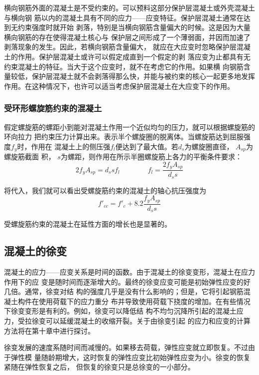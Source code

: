 \documentclass[12pt,a4paper]{book}
\begin{document}
横向钢筋外面的混凝土是不受约束的。可以预料这部分保护层混凝土或外壳混凝土与横向钢
筋以内的混凝土具有不同的应力——应变特征。保护层混凝土通常在达到无约束强度时就开始
剥落，特别是当横向钢筋含量偏大的时候。这是因为大量横向钢筋的存在使得混凝土核心与
保护层之间形成了一个薄弱面，并因而加速了剥落现象的发生。因此，若横向钢筋含量偏大，
就应在大应变时忽略保护层混凝土的作用。保护层混凝土或许可以假定成直到一个假定的剥
落应变为止都具有无约束混凝土的特征。当大于这个应变时，就不在考虑它的作用。如果横
向钢筋含量较低，保护层混凝土就不会剥落得那么快，并能与被约束的核心一起更多地发挥
作用。在这种情况下，也许可以适当考虑保护层混凝土在大应变下的作用。

\subsubsection{受环形螺旋筋约束的混凝土}

假定螺旋筋的螺距小到能对混凝土作用一个近似均匀的压力，就可以根据螺旋筋的环向拉力
把约束压力计算出来。表示半个螺旋圈的脱离体。当螺旋筋达到屈服强度$f_y$时，作用在
混凝土上的侧压强$f_l$便达到了最大值。若$d_s$为螺旋圈直径， $A_{sp}$为螺旋筋截面
积， $s$为螺距，则作用在所示半圈螺旋筋上各力的平衡条件要求：
\begin{equation}
  \label{eq:33}
  2f_yA_{sp}=d_ssf_l \qquad \qquad f_l=\frac{2f_yA_{sp}}{d_ss}
\end{equation}

将代入，我们就可以看出受螺旋筋约束的混凝土的轴心抗压强度为
\begin{equation}
  \label{eq:34}
  f'_{cc}=f'_c+8.2\frac{f_yA_{sp}}{d_ss}
\end{equation}

受螺旋筋约束的混凝土在延性方面的增长也是显著的。

\subsection{混凝土的徐变}

混凝土的应力——应变关系是时间的函数。由于混凝土的徐变变形，混凝土在应力作用下的应
变是随时间而逐渐增大的。最终的徐变应变可能是初始弹性应变的好几倍。通常，徐变对结
构的强度几乎是没有什么影响的；但是，它将引起钢筋混凝土构件在使用荷载下的应力重分
布并导致使用荷载下挠度的增加。在有些情况下徐变变形是有利的。例如，徐变可以降低结
构不均匀沉降所引起的混凝土应力，受拉徐变可以延缓混凝土的收缩开裂。关于由徐变引起
的应力和应变的计算方法将在第十章中进行探讨。

徐变发展的速度系随时间而减慢的。如果移去荷载，弹性应变就立即恢复。不过由于弹性模
量随龄期增大，这时恢复的弹性应变比初始弹性应变为小。徐变的恢复紧随在弹性恢复之后，
但恢复的徐变只是总徐变的一小部分。
\end{document}
